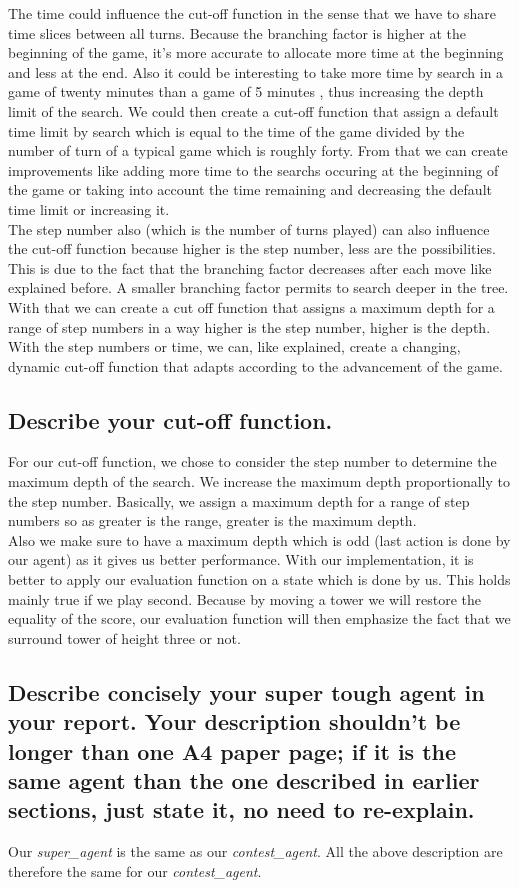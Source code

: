 \documentclass[10pt,a4paper]{article}
\begin{document}
The time could influence the cut-off function in the sense that we have to share time slices between all turns. Because the branching factor is higher at the beginning of the game, it's more accurate to allocate more time at the beginning and less at the end. Also it could be interesting to take more time by search in a game of twenty minutes than a game of 5 minutes , thus increasing the depth limit of the search. We could then create a cut-off function that assign a default time limit by search which is equal to the time of the game divided by the number of turn of a typical game which is roughly forty. From that we can create improvements like adding more time to the searchs occuring at the beginning of the game or taking into account the time remaining and decreasing the default time limit or increasing it.\\

The step number also (which is the number of turns played) can also influence the cut-off function because higher is the step number, less are the possibilities. This is due to the fact that the branching factor decreases after each move like explained before. A smaller branching factor permits to search deeper in the tree. With that we can create a cut off function that assigns a maximum depth for a range of step numbers in a way higher is the step number, higher is the depth.\\

With the step numbers or time, we can, like explained, create a changing, dynamic cut-off function that adapts according to the advancement of the game.

\subsection{Describe your cut-off function.}

For our cut-off function, we chose to consider the step number to determine the maximum depth of the search. We increase the maximum depth proportionally to the step number. Basically, we assign a maximum depth for a range of step numbers so as greater is the range, greater is the maximum depth. \\

Also we make sure to have a maximum depth which is odd (last action is done by our agent) as it gives us better performance. With our implementation, it is better to apply our evaluation function on a state which is done by us. This holds mainly true if we play second. Because by moving a tower we will restore the equality of the score, our evaluation function will then emphasize the fact that we surround tower of height three or not.

\subsection{Describe concisely your super tough agent in your report. Your description shouldn’t be longer than one A4 paper page; if it is the same agent than the one described in earlier sections, just state it, no need to re-explain.}

Our \textit{super\_agent} is the same as our \textit{contest\_agent}. All the above description are therefore the same for our \textit{contest\_agent}.
\end{document}
